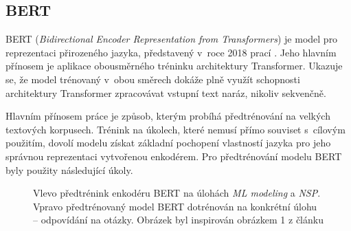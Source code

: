 \subsection{BERT}
BERT (\textit{Bidirectional Encoder Representation from Transformers}) je model pro reprezentaci přirozeného jazyka, představený v~roce 2018 prací \cite{BERT}. Jeho hlavním přínosem je aplikace obousměrného tréninku  architektury Transformer. Ukazuje se, že model trénovaný v~obou směrech dokáže plně využít schopnosti architektury Transformer zpracovávat vstupní text naráz, nikoliv sekvenčně.\par\smallskip
Hlavním přínosem práce \cite{BERT} je způsob, kterým probíhá předtrénování na velkých textových korpusech. Trénink na úkolech, které nemusí přímo souviset s~cílovým použitím, dovolí modelu získat základní pochopení vlastností jazyka pro jeho správnou reprezentaci vytvořenou enkodérem. Pro předtrénování modelu BERT byly použity následující úkoly.

\begin{figure}[hbt]
	\centering
	\caption{Vlevo předtrénink enkodéru BERT na úlohách \emph{ML modeling} a \emph{NSP}. Vpravo předtrénovaný model BERT dotrénován na konkrétní úlohu -- odpovídání na otázky. Obrázek byl inspirován obrázkem 1 z článku \cite{BERT}}
	\label{bert}
\end{figure}

